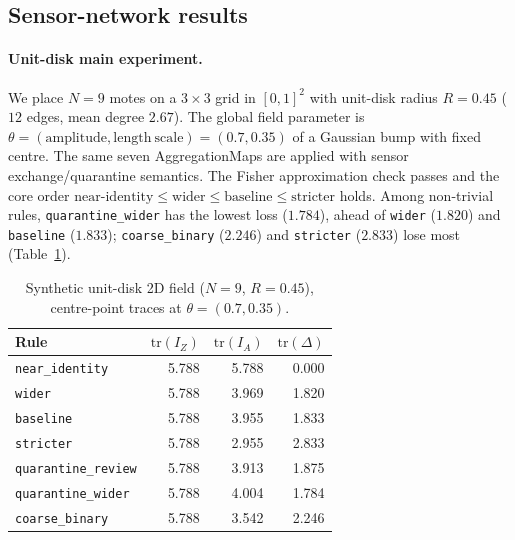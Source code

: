 \documentclass[11pt,a4paper]{article}
\begin{document}
\subsection{Sensor-network results}
\label{sec:sensor-results}

\paragraph{Unit-disk main experiment.}
We place $N=9$ motes on a $3\times3$ grid in $[0,1]^2$ with unit-disk radius
$R=0.45$ ($12$ edges, mean degree $2.67$). The global field parameter is
$\theta=(\mathrm{amplitude},\mathrm{length\ scale})=(0.7,0.35)$ of a Gaussian
bump with fixed centre. The same seven AggregationMaps are applied with sensor
exchange/quarantine semantics. The Fisher approximation check passes and the
core order
$\mathrm{near\text{-}identity}\le\mathrm{wider}\le\mathrm{baseline}
\le\mathrm{stricter}$ holds. Among non-trivial rules,
\texttt{quarantine\_wider} has the lowest loss ($1.784$), ahead of
\texttt{wider} ($1.820$) and \texttt{baseline} ($1.833$);
\texttt{coarse\_binary} ($2.246$) and \texttt{stricter} ($2.833$) lose most
(Table~\ref{tab:unitdisk}).

\begin{table}[t]
\centering
\caption{Synthetic unit-disk 2D field ($N=9$, $R=0.45$), centre-point traces at $\theta=(0.7,0.35)$.}
\label{tab:unitdisk}
\begin{tabular}{lrrr}
\toprule
Rule & $\mathrm{tr}(I_Z)$ & $\mathrm{tr}(I_A)$ & $\mathrm{tr}(\Delta)$ \\
\midrule
\texttt{near\_identity} & 5.788 & 5.788 & 0.000 \\
\texttt{wider} & 5.788 & 3.969 & 1.820 \\
\texttt{baseline} & 5.788 & 3.955 & 1.833 \\
\texttt{stricter} & 5.788 & 2.955 & 2.833 \\
\texttt{quarantine\_review} & 5.788 & 3.913 & 1.875 \\
\texttt{quarantine\_wider} & 5.788 & 4.004 & 1.784 \\
\texttt{coarse\_binary} & 5.788 & 3.542 & 2.246 \\
\bottomrule
\end{tabular}
\end{table}
\end{document}
